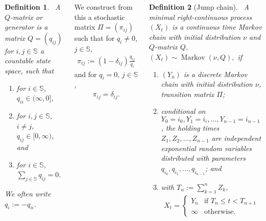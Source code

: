 \documentclass{tikzposter} %
\DeclareMathOperator{\Markov}{Markov}
\newcommand\leftopen[2]{\ensuremath{(#1,#2]}}
\newcommand\rightopen[2]{\ensuremath{[#1,#2)}}
\newtheorem{definition}{Definition}
\begin{document}
\begin{columns}
{    \begin{definition}
    \ A $Q$-matrix or generator is a matrix $Q = (q_{ij})$ for $i,j \in \mathbb{S}$ a countable state space, such that
    \begin{enumerate}[label=\roman*.]
            \item for $i \in \mathbb{S}$, $q_{ii} \in \leftopen{\infty}{0}$,
            \item for $i, j \in \mathbb{S}$, $i \neq j$, $q_{ij} \in \rightopen{0}{\infty}$, and
      \item for $i \in \mathbb{S}$, $\displaystyle \sum_{j \in \mathbb{S}} q_{ij} = 0$.
    \end{enumerate}
    We often write $q_{i} := -q_{ii}$.
    \end{definition}
    \hphantom{}

    We construct from this a stochastic matrix $\Pi = (\pi_{ij})$ such that for $q_{i} \neq 0$, $j \in \mathbb{S}$,
    \begin{align*}
      \pi_{ij} := (1-\delta_{ij}) \frac{q_{ij}}{q_{i}}
    \end{align*}
    and for $q_{i} = 0$, $j \in \mathbb{S}$,
    \begin{align*}
      \pi_{ij} = \delta_{ij}.
    \end{align*}
    \hphantom{}


    \begin{definition}[Jump chain]
    \ A minimal right-continuous process $(X_{t})$ is a continuous time Markov chain with initial distribution $\nu$ and $Q$-matrix $Q$, $(X_{t}) \sim \Markov(\nu, Q),$ if
    \begin{enumerate}[label=\roman*.]
            \item $(Y_{n})$ is a discrete Markov chain with initial distribution $\nu$, transition matrix $\Pi$;
            \item conditional on $Y_{0} = i_{0}, Y_{1} = i_{i}, \dots, Y_{n-1} = i_{n-1}$, the holding times $Z_{1},Z_{2},\dots,Z_{n-1}$ are independent exponential random variables distributed with parameters $q_{i_{0}},q_{i_{1}},\dots,q_{i_{n-1}}$; and
      \item with $T_{n} := \sum_{k=1}^{n} Z_{k}$,
            \begin{align*}
              X_{t} = \begin{cases}
                Y_{n} & \text{if } T_{n} \le t < T_{n+1} \\
                \infty & \text{otherwise}.
                \end{cases}
            \end{align*}
    \end{enumerate}
    \end{definition}
    \hphantom{}



  }
\end{columns}
\end{document}
